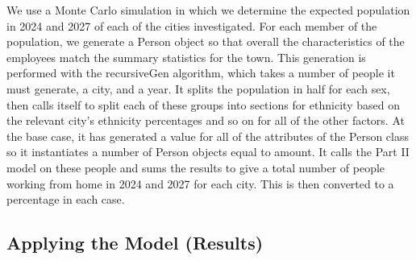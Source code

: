             
            We use a Monte Carlo simulation in which we determine the expected population in 2024 and 2027 of each of the cities investigated. For each member of the population, we generate a Person object so that overall the characteristics of the employees match the summary statistics for the town. This generation is performed with the recursiveGen algorithm, which takes a number of people it must generate, a city, and a year. It splits the population in half for each sex, then calls itself to split each of these groups into sections for ethnicity based on the relevant city's ethnicity percentages and so on for all of the other factors. At the base case, it has generated a value for all of the attributes of the Person class so it instantiates a number of Person objects equal to amount. It calls the Part II model on these people and sums the results to give a total number of people working from home in 2024 and 2027 for each city. This is then converted to a percentage in each case.
        

        \subsection{Applying the Model (Results)}  

